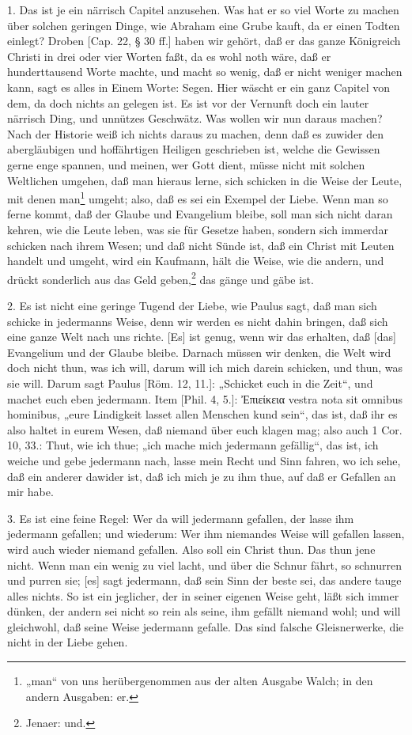 1. Das ist je ein närrisch Capitel anzusehen. Was hat er so viel Worte zu machen über solchen geringen Dinge, wie Abraham eine Grube kauft, da er einen Todten einlegt? Droben [Cap. 22, § 30 ff.] haben wir gehört, daß er das ganze Königreich Christi in drei oder vier Worten faßt, da es wohl noth wäre, daß er hunderttausend Worte machte, und macht so wenig, daß er nicht weniger machen kann, sagt es alles in Einem Worte: Segen. Hier wäscht er ein ganz Capitel von dem, da doch nichts an gelegen ist. Es ist vor der Vernunft doch ein lauter närrisch Ding, und unnützes Geschwätz. Was wollen wir nun daraus machen? Nach der Historie weiß ich nichts daraus zu machen, denn daß es zuwider den abergläubigen und hoffährtigen Heiligen geschrieben ist, welche die Gewissen gerne enge spannen, und meinen, wer Gott dient, müsse nicht mit solchen Weltlichen umgehen, daß man hieraus lerne, sich schicken in die Weise der Leute, mit denen man\footnote{„man“ von uns herübergenommen aus der alten Ausgabe Walch; in den andern Ausgaben: er.} umgeht; also,
daß es sei ein Exempel der Liebe. Wenn man so ferne kommt, daß der Glaube und Evangelium bleibe, soll man sich nicht daran kehren, wie die Leute leben, was sie für Gesetze haben, sondern sich immerdar schicken nach ihrem Wesen; und daß nicht Sünde ist, daß ein Christ mit Leuten handelt und umgeht, wird ein Kaufmann, hält die Weise, wie die andern, und drückt sonderlich aus das Geld geben,\footnote{Jenaer: und.} das gänge und gäbe ist.

2. Es ist nicht eine geringe Tugend der Liebe, wie Paulus sagt, daß man sich schicke in jedermanns Weise, denn wir werden es nicht dahin bringen, daß sich eine ganze Welt nach uns richte. [Es] ist genug, wenn wir das erhalten, daß [das] Evangelium und der Glaube bleibe. Darnach müssen wir denken, die Welt wird doch nicht thun, was ich will, darum will ich mich darein schicken, und thun, was sie will. Darum sagt Paulus [Röm. 12, 11.]: „Schicket euch in die Zeit“, und machet euch eben jedermann. Item [Phil. 4, 5.]: Ἐπιείκεια vestra nota sit omnibus hominibus, „eure Lindigkeit lasset allen Menschen kund sein“, das ist, daß ihr es also haltet in eurem Wesen, daß niemand über euch klagen mag; also auch 1 Cor. 10, 33.: Thut, wie ich thue; „ich mache mich jedermann gefällig“, das ist, ich weiche und gebe jedermann nach, lasse mein Recht und Sinn fahren, wo ich sehe, daß ein anderer dawider ist, daß ich mich je zu ihm thue, auf daß er Gefallen an mir habe.

3. Es ist eine feine Regel: Wer da will jedermann gefallen, der lasse ihm jedermann gefallen; und wiederum: Wer ihm niemandes Weise will gefallen lassen, wird auch wieder niemand gefallen. Also soll ein Christ thun. Das thun jene nicht. Wenn man ein wenig zu viel lacht, und über die Schnur fährt, so schnurren und purren sie; [es] sagt jedermann, daß sein Sinn der beste sei, das andere tauge alles nichts. So ist ein jeglicher, der in seiner eigenen Weise geht, läßt sich immer dünken, der andern sei nicht so rein als seine, ihm gefällt niemand wohl; und will gleichwohl, daß seine Weise jedermann gefalle. Das sind falsche Gleisnerwerke, die nicht in der Liebe gehen.

